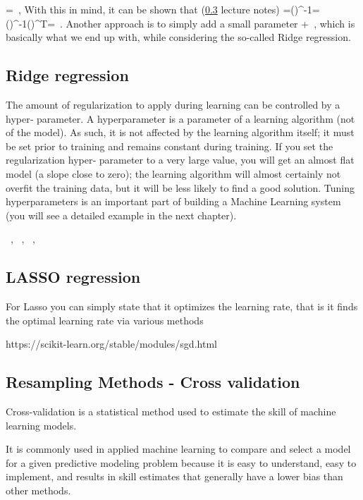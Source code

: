 \be{}
=\, ,
\ee
With this in mind, it can be shown that (\ref{} lecture notes)
\be{}
=\left(\right)^{-1}=\left(\right)^{-1}\left(\right)^T=\, .
\ee
Another approach is to simply add a small parameter
\be{}
\rightarrow{}+\, ,
\ee
which is basically what we end up with, while considering the so-called Ridge regression.

\subsection{Ridge regression}

The amount of regularization to apply during learning can be controlled by a hyper‐ parameter. A hyperparameter is a parameter of a learning algorithm (not of the model). As such, it is not affected by the learning algorithm itself; it must be set prior to training and remains constant during training. If you set the regularization hyper‐ parameter to a very large value, you will get an almost flat model (a slope close to zero); the learning algorithm will almost certainly not overfit the training data, but it will be less likely to find a good solution. Tuning hyperparameters is an important part of building a Machine Learning system (you will see a detailed example in the next chapter).

\be{}
\, ,
\ee
\be{}
\, ,
\ee
\be{}
\, ,
\ee

\subsection{LASSO regression}

For Lasso you can simply state that it optimizes the learning rate, that is it finds the optimal learning rate via various methods

https://scikit-learn.org/stable/modules/sgd.html

\subsection{Resampling Methods - Cross validation}
Cross-validation is a statistical method used to estimate the skill of machine learning models.

It is commonly used in applied machine learning to compare and select a model for a given predictive modeling problem because it is easy to understand, easy to implement, and results in skill estimates that generally have a lower bias than other methods.

